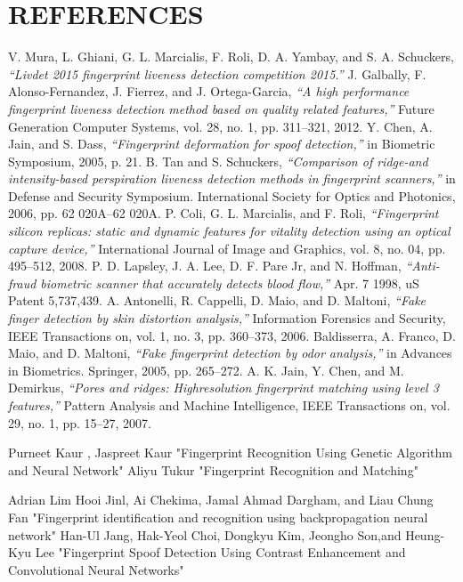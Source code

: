 \documentclass[a4paper,12pt,oneside]{article}
\begin{document}
\newpage
\cleardoublepage
\section{REFERENCES}
\begin{thebibliography}{9}


 V. Mura, L. Ghiani, G. L. Marcialis, F. Roli, D. A. Yambay, and
S. A. Schuckers,\emph{ “Livdet 2015 fingerprint liveness detection competition
2015.”}
 J. Galbally, F. Alonso-Fernandez, J. Fierrez, and J. Ortega-Garcia,\emph{ “A
high performance fingerprint liveness detection method based on quality
related features,” }Future Generation Computer Systems, vol. 28, no. 1,
pp. 311–321, 2012.
 Y. Chen, A. Jain, and S. Dass, \emph{“Fingerprint deformation for spoof
detection,” }in Biometric Symposium, 2005, p. 21.
 B. Tan and S. Schuckers,\emph{ “Comparison of ridge-and intensity-based
perspiration liveness detection methods in fingerprint scanners,”} in
Defense and Security Symposium. International Society for Optics and
Photonics, 2006, pp. 62 020A–62 020A.
 P. Coli, G. L. Marcialis, and F. Roli, \emph{“Fingerprint silicon replicas: static
and dynamic features for vitality detection using an optical capture
device,”} International Journal of Image and Graphics, vol. 8, no. 04,
pp. 495–512, 2008.
 P. D. Lapsley, J. A. Lee, D. F. Pare Jr, and N. Hoffman, \emph{“Anti-fraud
biometric scanner that accurately detects blood flow,”} Apr. 7 1998, uS
Patent 5,737,439.
A. Antonelli, R. Cappelli, D. Maio, and D. Maltoni, \emph{“Fake finger detection
by skin distortion analysis,” }Information Forensics and Security,
IEEE Transactions on, vol. 1, no. 3, pp. 360–373, 2006.
 Baldisserra, A. Franco, D. Maio, and D. Maltoni, \emph{“Fake fingerprint
detection by odor analysis,”} in Advances in Biometrics. Springer, 2005,
pp. 265–272.
 A. K. Jain, Y. Chen, and M. Demirkus,\emph{ “Pores and ridges: Highresolution
fingerprint matching using level 3 features,”} Pattern Analysis
and Machine Intelligence, IEEE Transactions on, vol. 29, no. 1, pp.
15–27, 2007.

Purneet Kaur , Jaspreet Kaur {"Fingerprint Recognition Using Genetic Algorithm and Neural Network"} 
Aliyu Tukur {"Fingerprint Recognition and Matching" }

  Adrian Lim Hooi Jinl, Ai Chekima, Jamal Ahmad Dargham, and Liau Chung Fan {"Fingerprint identification and recognition using backpropagation neural network"}
Han-Ul Jang, Hak-Yeol Choi, Dongkyu Kim, Jeongho Son,and Heung-Kyu Lee {"Fingerprint Spoof Detection Using Contrast
Enhancement and Convolutional
Neural Networks"}


\end{thebibliography}
\end{document}
